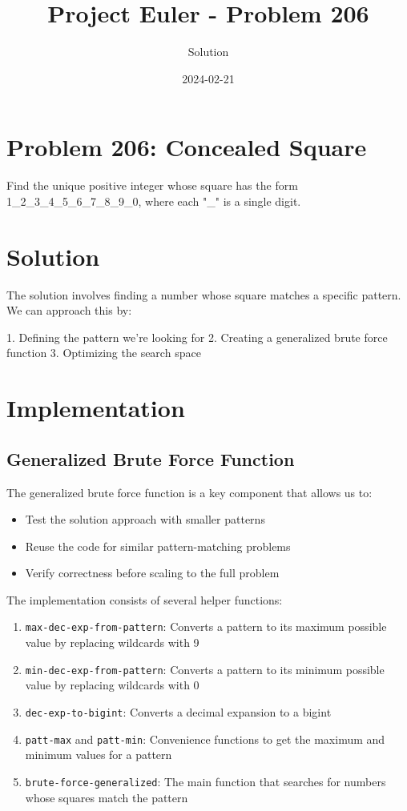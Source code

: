 \documentclass{article}
\title{Project Euler - Problem 206}
\author{Solution}
\date{2024-02-21}
\begin{document}
\maketitle

\section*{Problem 206: Concealed Square}

Find the unique positive integer whose square has the form 1_2_3_4_5_6_7_8_9_0,
where each "_" is a single digit.

\section*{Solution}

The solution involves finding a number whose square matches a specific pattern. We can approach this by:

1. Defining the pattern we're looking for
2. Creating a generalized brute force function
3. Optimizing the search space

\section*{Implementation}

\subsection*{Generalized Brute Force Function}

The generalized brute force function is a key component that allows us to:
\begin{itemize}
\item Test the solution approach with smaller patterns
\item Reuse the code for similar pattern-matching problems
\item Verify correctness before scaling to the full problem
\end{itemize}

The implementation consists of several helper functions:

\begin{enumerate}
\item \texttt{max-dec-exp-from-pattern}: Converts a pattern to its maximum possible value by replacing wildcards with 9
\item \texttt{min-dec-exp-from-pattern}: Converts a pattern to its minimum possible value by replacing wildcards with 0
\item \texttt{dec-exp-to-bigint}: Converts a decimal expansion to a bigint
\item \texttt{patt-max} and \texttt{patt-min}: Convenience functions to get the maximum and minimum values for a pattern
\item \texttt{brute-force-generalized}: The main function that searches for numbers whose squares match the pattern
\end{enumerate}
\end{document}
